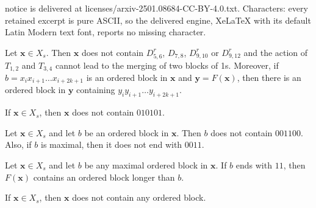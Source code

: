 \documentclass[10pt,a4paper]{amsart}
\newcommand{\bx}{\mathbf{x}}
\newcommand{\by}{\mathbf{y}}
\newcommand{\xconst}{X_{s}}
\begin{document}
notice is delivered at licenses/arxiv-2501.08684-CC-BY-4.0.txt. Characters: every retained excerpt is pure ASCII, so the delivered engine, XeLaTeX with its default Latin Modern text font, reports no missing character.
\begin{prop}\label{thm:5-12}
    Let $\bx\in \xconst$. Then $\bx$ does not contain $D_{5,6}^r$, $D_{7,8}$, $D_{9,10}^r$ or $D_{9,12}^r$ and the action of $T_{1,2}$ and $T_{3,4}$ cannot lead to the merging of two blocks of 1s. Moreover, if $b=x_{i}x_{i+1}\ldots x_{i+2k+1}$ is an ordered block in $\bx$ and $\by=F(\bx)$, then there is an ordered block in $\by$ containing $y_{i}y_{i+1}\ldots y_{i+2k+1}$.
\end{prop}

\begin{lem}\label{lem:alter}
If $\bx\in \xconst$, then $\bx$ does not contain $010101$.
\end{lem}

\begin{lem}\label{lem:D56}
Let $\bx\in \xconst$ and let $b$ be an ordered block in $\bx$. Then $b$ does not contain $001100$. Also, if $b$ is maximal, then it does not end with $0011$.
\end{lem}

\begin{lem}\label{lem:longer}
Let $\bx\in \xconst$ and let $b$ be any maximal ordered block in $\bx$. If $b$ ends with $11$, then $F(\bx)$ contains an ordered block longer than $b$.
\end{lem}

\begin{prop}
\label{lem:snakes}
If $\bx\in \xconst$, then $\bx$ does not contain any ordered block.
\end{prop}
\end{document}
